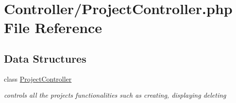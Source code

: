 \hypertarget{_project_controller_8php}{}\section{Controller/\+Project\+Controller.php File Reference}
\label{_project_controller_8php}
\subsection*{Data Structures}
\begin{DoxyCompactItemize}
\item 
class \hyperlink{class_project_controller}{Project\+Controller}
\begin{DoxyCompactList}\small\item\em controls all the project\textquotesingle{}s functionalities such as creating, displaying deleting \end{DoxyCompactList}\end{DoxyCompactItemize}
